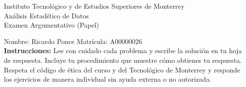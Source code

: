 \documentclass[10pt]{report}
\begin{document}
\newpage



\begin{center}
{\large Instituto Tecnol\'{o}gico y de Estudios Superiores de Monterrey \\
An\'alisis Estad\'stico de Datos } \\
Examen Argumentativo (Papel)
\end{center}

Nombre: \underline{\hspace*{.2in}}
Ricardo Ponce
\underline{\hspace*{.2in}} \quad Matr\'icula:\underline{\hspace*{.2in}}
A00000026
\underline{\hspace*{.2in}} \\

{\bf Instrucciones:} Lee con cuidado cada problema y escribe la soluci\'on
en tu hoja de respuesta. Incluye tu procedimiento que muestre c\'omo obtienes tu respuesta.  Respeta el c\'odigo de \'etica del curso y del Tecnol\'ogico de Monterrey y responde los ejercicios de manera individual sin ayuda externa o no autorizada.
\end{document}
